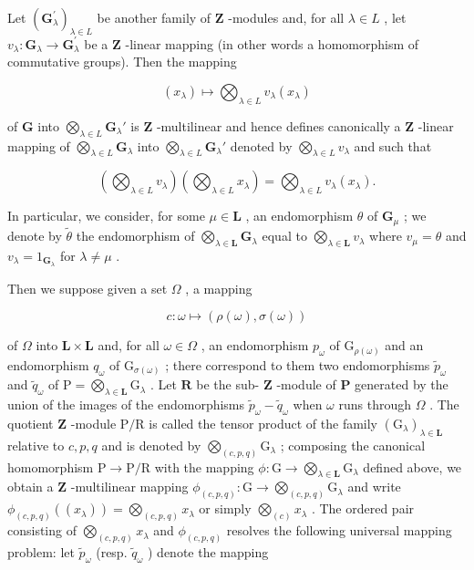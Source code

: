 Let \((\mathbf{G}_{\lambda}^{\prime})_{\lambda \in L}\) be another family of \(\mathbf{Z}\) -modules and, for all \(\lambda \in L\) , let \(v_{\lambda}: \mathbf{G}_{\lambda} \to \mathbf{G}_{\lambda}^{\prime}\) be a \(\mathbf{Z}\) -linear mapping (in other words a homomorphism of commutative groups). Then the mapping

\[
(x _ {\lambda}) \mapsto \bigotimes_ {\lambda \in L} v _ {\lambda} (x _ {\lambda})
\]

of \(\mathbf{G}\) into \(\bigotimes_{\lambda \in L} \mathbf{G}_{\lambda}'\) is \(\mathbf{Z}\) -multilinear and hence defines canonically a \(\mathbf{Z}\) -linear mapping of \(\bigotimes_{\lambda \in L} \mathbf{G}_{\lambda}\) into \(\bigotimes_{\lambda \in L} \mathbf{G}_{\lambda}'\) denoted by \(\bigotimes_{\lambda \in L} v_{\lambda}\) and such that

\[
\left(\bigotimes_ {\lambda \in L} v _ {\lambda}\right) \left(\bigotimes_ {\lambda \in L} x _ {\lambda}\right) = \bigotimes_ {\lambda \in L} v _ {\lambda} (x _ {\lambda}).\tag{25}
\]

In particular, we consider, for some \(\mu \in \mathbf{L}\) , an endomorphism \(\theta\) of \(\mathbf{G}_{\mu}\) ; we denote by \(\tilde{\theta}\) the endomorphism of \(\bigotimes_{\lambda \in \mathbf{L}} \mathbf{G}_{\lambda}\) equal to \(\bigotimes_{\lambda \in \mathbf{L}} v_{\lambda}\) where \(v_{\mu} = \theta\) and \(v_{\lambda} = 1_{\mathbf{G}_{\lambda}}\) for \(\lambda \neq \mu\) .

Then we suppose given a set \(\Omega\) , a mapping

\[
c: \omega \mapsto (\rho (\omega), \sigma (\omega))
\]

of \(\Omega\) into \(\mathbf{L} \times \mathbf{L}\) and, for all \(\omega \in \Omega\) , an endomorphism \(p_{\omega}\) of \(\mathrm{G}_{\rho(\omega)}\) and an endomorphism \(q_{\omega}\) of \(\mathrm{G}_{\sigma(\omega)}\) ; there correspond to them two endomorphisms \(\tilde{p}_{\omega}\) and \(\tilde{q}_{\omega}\) of \(\mathrm{P} = \bigotimes_{\lambda \in \mathbf{L}} \mathrm{G}_{\lambda}\) . Let \(\mathbf{R}\) be the sub- \(\mathbf{Z}\) -module of \(\mathbf{P}\) generated by the union of the images of the endomorphisms \(\tilde{p}_{\omega} - \tilde{q}_{\omega}\) when \(\omega\) runs through \(\Omega\) . The quotient \(\mathbf{Z}\) -module \(\mathrm{P/R}\) is called the tensor product of the family \((\mathrm{G}_{\lambda})_{\lambda \in \mathbf{L}}\) relative to \(c, p, q\) and is denoted by \(\bigotimes_{(c, p, q)} \mathrm{G}_{\lambda}\) ; composing the canonical homomorphism \(\mathrm{P} \to \mathrm{P/R}\) with the mapping \(\phi: \mathrm{G} \to \bigotimes_{\lambda \in \mathbf{L}} \mathrm{G}_{\lambda}\) defined above, we obtain a \(\mathbf{Z}\) -multilinear mapping \(\phi_{(c, p, q)}: \mathrm{G} \to \bigotimes_{(c, p, q)} \mathrm{G}_{\lambda}\) and write \(\phi_{(c, p, q)}((x_{\lambda})) = \bigotimes_{(c, p, q)} x_{\lambda}\) or simply \(\bigotimes_{(c)} x_{\lambda}\) . The ordered pair consisting of \(\bigotimes_{(c, p, q)} x_{\lambda}\) and \(\phi_{(c, p, q)}\) resolves the following universal mapping problem: let \(\tilde{p}_{\omega}\) (resp. \(\tilde{q}_{\omega}\) ) denote the mapping

